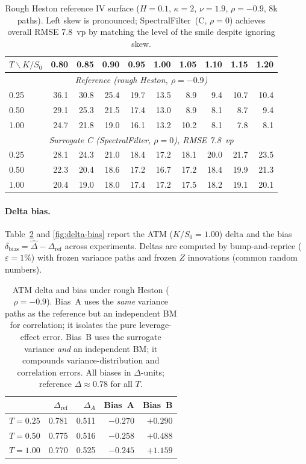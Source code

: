 \documentclass[11pt,a4paper]{article}
\begin{document}
\begin{table}[h]
\centering
\caption{Rough Heston reference IV surface ($H=0.1$, $\kappa=2$,
$\nu=1.9$, $\rho=-0.9$, 8k paths). Left skew is pronounced;
SpectralFilter~(C, $\rho=0$) achieves overall RMSE 7.8~vp by
matching the level of the smile despite ignoring skew.}
\label{tab:iv-rh}
\begin{tabular}{lrrrrrrrrr}
\toprule
$T \backslash K/S_0$ & 0.80 & 0.85 & 0.90 & 0.95 & 1.00
           & 1.05 & 1.10 & 1.15 & 1.20 \\
\midrule
\multicolumn{10}{c}{\textit{Reference (rough Heston, $\rho=-0.9$)}} \\
0.25 & 36.1 & 30.8 & 25.4 & 19.7 & 13.5 & 8.9 & 9.4 & 10.7 & 10.4 \\
0.50 & 29.1 & 25.3 & 21.5 & 17.4 & 13.0 & 8.9 & 8.1 & 8.7 & 9.4 \\
1.00 & 24.7 & 21.8 & 19.0 & 16.1 & 13.2 & 10.2 & 8.1 & 7.8 & 8.1 \\
\midrule
\multicolumn{10}{c}{\textit{Surrogate C (SpectralFilter, $\rho=0$), RMSE 7.8~vp}} \\
0.25 & 28.1 & 24.3 & 21.0 & 18.4 & 17.2 & 18.1 & 20.0 & 21.7 & 23.5 \\
0.50 & 22.3 & 20.4 & 18.6 & 17.2 & 16.7 & 17.2 & 18.4 & 19.9 & 21.3 \\
1.00 & 20.4 & 19.0 & 18.0 & 17.4 & 17.2 & 17.5 & 18.2 & 19.1 & 20.1 \\
\bottomrule
\end{tabular}
\end{table}

\paragraph{Delta bias.}
Table~\ref{tab:delta-bias} and \cref{fig:delta-bias} report the ATM
($K/S_0 = 1.00$) delta and the bias
$\delta_\mathrm{bias} = \hat\Delta - \Delta_\mathrm{ref}$ across
experiments. Deltas are computed by bump-and-reprice ($\varepsilon =
1\%$) with frozen variance paths and frozen $Z$ innovations (common
random numbers).

\begin{table}[h]
\centering
\caption{ATM delta and bias under rough Heston ($\rho=-0.9$).
Bias~A uses the \emph{same} variance paths as the reference but an
independent BM for correlation; it isolates the pure leverage-effect
error. Bias~B uses the surrogate variance \emph{and} an independent
BM; it compounds variance-distribution and correlation errors.
All biases in $\Delta$-units; reference $\Delta \approx 0.78$ for all $T$.}
\label{tab:delta-bias}
\begin{tabular}{lrrrr}
\toprule
 & $\Delta_{\mathrm{ref}}$ & $\Delta_A$ & Bias~A & Bias~B \\
\midrule
$T = 0.25$ & 0.781 & 0.511 & $-0.270$ & $+0.290$ \\
$T = 0.50$ & 0.775 & 0.516 & $-0.258$ & $+0.488$ \\
$T = 1.00$ & 0.770 & 0.525 & $-0.245$ & $+1.159$ \\
\bottomrule
\end{tabular}
\end{table}
\end{document}
